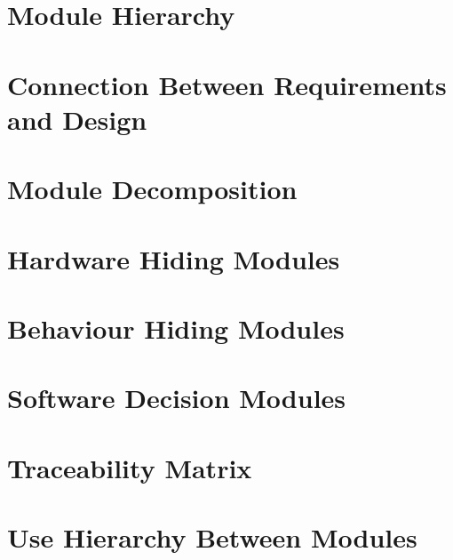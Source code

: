 \documentclass{article}
\begin{document}
\section*{Module Hierarchy}

\section*{Connection Between Requirements and Design}

\section*{Module Decomposition}
\section{Hardware Hiding Modules}
\section{Behaviour Hiding Modules}
\section{Software Decision Modules}

\section*{Traceability Matrix}

\section*{Use Hierarchy Between Modules}
\end{document}
